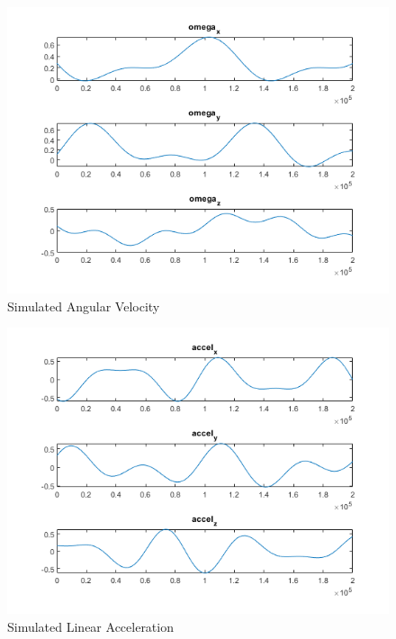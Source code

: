 \documentclass[conference]{IEEEtran}
\begin{document}
\begin{figure}
    \centering
    \includegraphics[width=0.95\linewidth]{figures/simulated_omega.png}
    \caption{Simulated Angular Velocity}
    \label{fig:omega}
\end{figure}
\begin{figure}
    \centering
    \includegraphics[width=0.95\linewidth]{figures/simulated_accel.png}
    \caption{Simulated Linear Acceleration}
    \label{fig:accel}
\end{figure}
\end{document}
